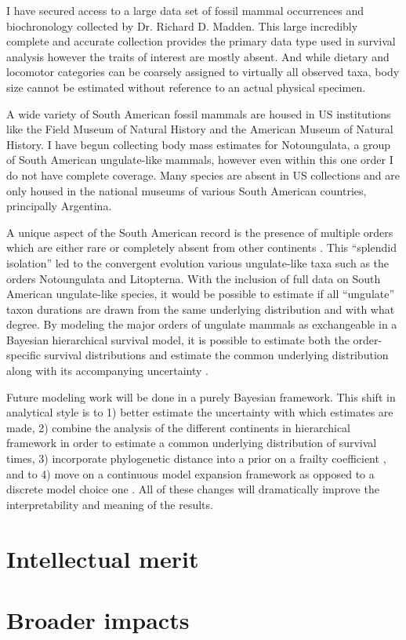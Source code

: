 \documentclass[11pt,letterpaper]{article}
\begin{document}
I have secured access to a large data set of fossil mammal occurrences and biochronology collected by Dr. Richard D. Madden. This large incredibly complete and accurate collection provides the primary data type used in survival analysis however the traits of interest are mostly absent. And while dietary and locomotor categories can be coarsely assigned to virtually all observed taxa, body size cannot be estimated without reference to an actual physical specimen. 

A wide variety of South American fossil mammals are housed in US institutions like the Field Museum of Natural History and the American Museum of Natural History. I have begun collecting body mass estimates for Notoungulata, a group of South American ungulate-like mammals, however even within this one order I do not have complete coverage. Many species are absent in US collections and are only housed in the national museums of various South American countries, principally Argentina. 

A unique aspect of the South American record is the presence of multiple orders which are either rare or completely absent from other continents \citep{Marshall1982,Macfadden1997,Macfadden2006,Flynn1998a}. This ``splendid isolation'' led to the convergent evolution various ungulate-like taxa such as the orders Notoungulata and Litopterna. With the inclusion of full data on South American ungulate-like species, it would be possible to estimate if all ``ungulate'' taxon durations are drawn from the same underlying distribution and with what degree. By modeling the major orders of ungulate mammals as exchangeable in a Bayesian hierarchical survival model, it is possible to estimate both the order-specific survival distributions and estimate the common underlying distribution along with its accompanying uncertainty \citep{Gelman2013d}.


Future modeling work will be done in a purely Bayesian framework. This shift in analytical style is to 1) better estimate the uncertainty with which estimates are made, 2) combine the analysis of the different continents in hierarchical framework in order to estimate a common underlying distribution of survival times, 3) incorporate phylogenetic distance into a prior on a frailty coefficient \citep{Banerjee2003a,Ibrahim2001}, and to 4) move on a continuous model expansion framework as opposed to a discrete model choice one \citep{Gelman2013d}. All of these changes will dramatically improve the interpretability and meaning of the results.


\section{Intellectual merit}
%
%

\section{Broader impacts}
%
%


\end{document}
